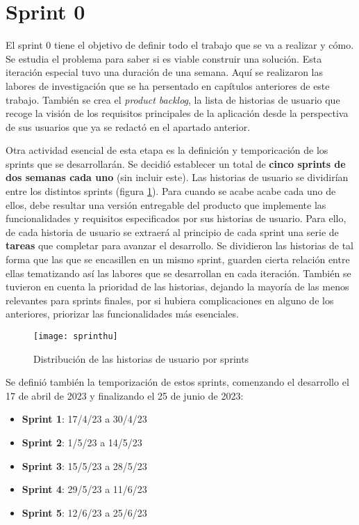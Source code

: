 \section{Sprint 0}

El sprint 0 tiene el objetivo de definir todo el trabajo que se va a realizar y cómo. Se estudia el problema para saber si es viable construir una solución. Esta iteración especial tuvo una duración de una semana. Aquí se realizaron las labores de investigación que se ha persentado en capítulos anteriores de este trabajo. También se crea el \textit{product backlog}, la lista de historias de usuario que recoge la visión de los requisitos principales de la aplicación desde la perspectiva de sus usuarios que ya se redactó en el apartado anterior.

Otra actividad esencial de esta etapa es la definición y temporicación de los sprints que se desarrollarán. Se decidió establecer un total de \textbf{cinco sprints de dos semanas cada uno} (sin incluir este). Las historias de usuario se dividirían entre los distintos sprints (figura \ref{fig:sprinthu}). Para cuando se acabe acabe cada uno de ellos, debe resultar una versión entregable del producto que implemente las funcionalidades y requisitos especificados por sus historias de usuario. Para ello, de cada historia de usuario se extraerá al principio de cada sprint una serie de \textbf{tareas} que completar para avanzar el desarrollo. Se dividieron las historias de tal forma que las que se encasillen en un mismo sprint, guarden cierta relación entre ellas tematizando así las labores que se desarrollan en cada iteración. También se tuvieron en cuenta la prioridad de las historias, dejando la mayoría de las menos relevantes para sprints finales, por si hubiera complicaciones en alguno de los anteriores, priorizar las funcionalidades más esenciales.

\begin{figure}[h]
    \centering
    \texttt{[image: sprinthu]}
    \caption[Planificación de HU por sprints]{Distribución de las historias de usuario por sprints}
	\label{fig:sprinthu}
\end{figure}

Se definió también la temporización de estos sprints, comenzando el desarrollo el 17 de abril de 2023 y finalizando el 25 de junio de 2023:
\begin{itemize}
    \item \textbf{Sprint 1}: 17/4/23 a 30/4/23
    \item \textbf{Sprint 2}: 1/5/23 a 14/5/23
    \item \textbf{Sprint 3}: 15/5/23 a 28/5/23
    \item \textbf{Sprint 4}: 29/5/23 a 11/6/23
    \item \textbf{Sprint 5}: 12/6/23 a 25/6/23
\end{itemize}

